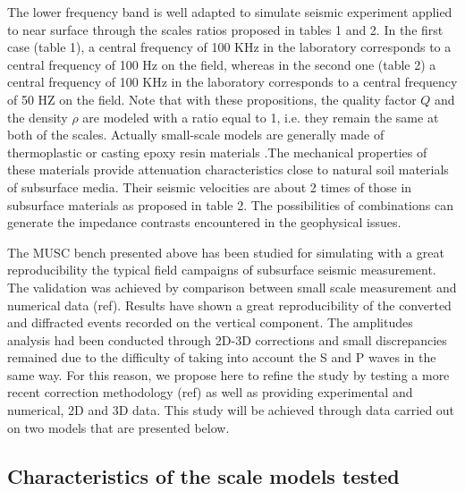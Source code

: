 \documentclass[manuscript,revised]{geophysics}
\begin{document}
\noindent The lower frequency band is well adapted to simulate seismic experiment applied to near surface through the scales ratios proposed in tables 1 and 2. In the first case (table 1), a central frequency of 100 KHz in the laboratory corresponds to a central frequency of 100 Hz on the field, whereas in the second one (table 2) a central frequency of 100 KHz in the laboratory corresponds to a central frequency of 50 HZ on the field. Note that with these propositions, the  quality factor $Q$ and the density $\rho$ are modeled with a ratio equal to 1, i.e. they remain the same at both of the scales. Actually small-scale models are generally made of thermoplastic or casting epoxy resin materials \citep{Bretaudeau_FWI_2013,Bretaudeau_SSM_2011,Bretaudeau_SSA_2008b}.The mechanical properties of these materials provide attenuation characteristics close to natural soil materials of subsurface media. Their seismic velocities are about 2 times of those in subsurface materials as proposed in table 2. The possibilities of combinations can generate the impedance contrasts encountered in the geophysical issues. 

\noindent The MUSC bench presented above has been studied for simulating with a great reproducibility the typical field campaigns of subsurface seismic measurement. The validation was achieved by comparison between small scale measurement and numerical data (ref). Results have shown a great reproducibility of the converted and diffracted events recorded on the vertical component. The amplitudes analysis had been conducted through 2D-3D corrections and small discrepancies remained due to the difficulty of taking into account the S and P waves in the same way. For this reason, we propose here to refine the study by testing a more recent correction methodology (ref) as well as providing experimental and numerical, 2D and 3D data. This study will be achieved through data carried out on two models that are presented below.


\subsection{Characteristics of the scale models tested}

\end{document}
